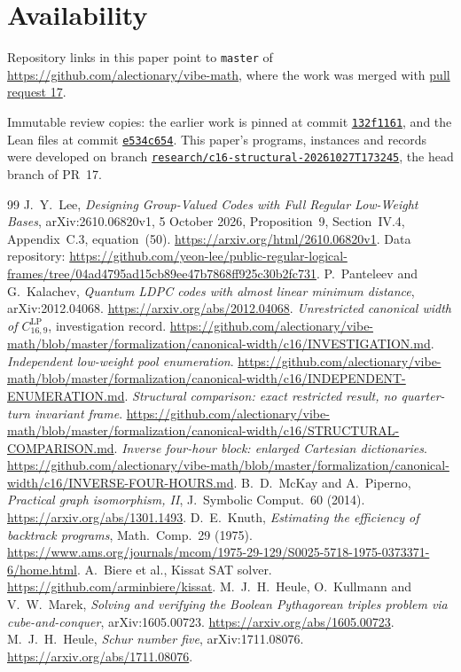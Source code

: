 \documentclass[11pt]{article}
\theoremstyle{definition}
\theoremstyle{remark}
\newcommand{\repourl}{https://github.com/alectionary/vibe-math}
\newcommand{\basecommit}{5ddae75bf1476b31fe49ed49b7e25dd1467fc6a9}
\newcommand{\cdir}{formalization/canonical-width/c16}
\newcommand{\leancommit}{04974c1ae00ddbabff3d4d4de8949773344f5e00}
\begin{document}
\section{Availability}
Repository links in this paper point to \texttt{master} of \url{https://github.com/alectionary/vibe-math}, where the work was merged with \href{https://github.com/alectionary/vibe-math/pull/17}{pull request 17}.

Immutable review copies: the earlier work is pinned at commit \href{\repourl/tree/\basecommit/\cdir}{\texttt{132f1161}}, and the Lean files at commit \href{\repourl/tree/\leancommit/formalization/canonical-width/c16/lean}{\texttt{e534c654}}. This paper's programs, instances and records were developed on branch \href{\repourl/tree/research/c16-structural-20261027T173245}{\texttt{research/c16-structural-20261027T173245}}, the head branch of PR~17.

\begin{thebibliography}{99}
 J.~Y.~Lee, \emph{Designing Group-Valued Codes with Full Regular Low-Weight Bases}, arXiv:2610.06820v1, 5 October 2026, Proposition~9, Section~IV.4, Appendix~C.3, equation~(50). \url{https://arxiv.org/html/2610.06820v1}. Data repository: \url{https://github.com/yeon-lee/public-regular-logical-frames/tree/04ad4795ad15cb89ee47b7868ff925c30b2fc731}.
 P.~Panteleev and G.~Kalachev, \emph{Quantum LDPC codes with almost linear minimum distance}, arXiv:2012.04068. \url{https://arxiv.org/abs/2012.04068}.
 \emph{Unrestricted canonical width of $C^{\mathrm{LP}}_{16,9}$}, investigation record. \url{https://github.com/alectionary/vibe-math/blob/master/formalization/canonical-width/c16/INVESTIGATION.md}.
 \emph{Independent low-weight pool enumeration}. \url{https://github.com/alectionary/vibe-math/blob/master/formalization/canonical-width/c16/INDEPENDENT-ENUMERATION.md}.
 \emph{Structural comparison: exact restricted result, no quarter-turn invariant frame}. \url{https://github.com/alectionary/vibe-math/blob/master/formalization/canonical-width/c16/STRUCTURAL-COMPARISON.md}.
 \emph{Inverse four-hour block: enlarged Cartesian dictionaries}. \url{https://github.com/alectionary/vibe-math/blob/master/formalization/canonical-width/c16/INVERSE-FOUR-HOURS.md}.
 B.~D.~McKay and A.~Piperno, \emph{Practical graph isomorphism, II}, J.\ Symbolic Comput.\ 60 (2014). \url{https://arxiv.org/abs/1301.1493}.
 D.~E.~Knuth, \emph{Estimating the efficiency of backtrack programs}, Math.\ Comp.\ 29 (1975). \url{https://www.ams.org/journals/mcom/1975-29-129/S0025-5718-1975-0373371-6/home.html}.
 A.~Biere et al., Kissat SAT solver. \url{https://github.com/arminbiere/kissat}.
 M.~J.~H.~Heule, O.~Kullmann and V.~W.~Marek, \emph{Solving and verifying the Boolean Pythagorean triples problem via cube-and-conquer}, arXiv:1605.00723. \url{https://arxiv.org/abs/1605.00723}.
 M.~J.~H.~Heule, \emph{Schur number five}, arXiv:1711.08076. \url{https://arxiv.org/abs/1711.08076}.
\end{thebibliography}
\appendix
\end{document}
